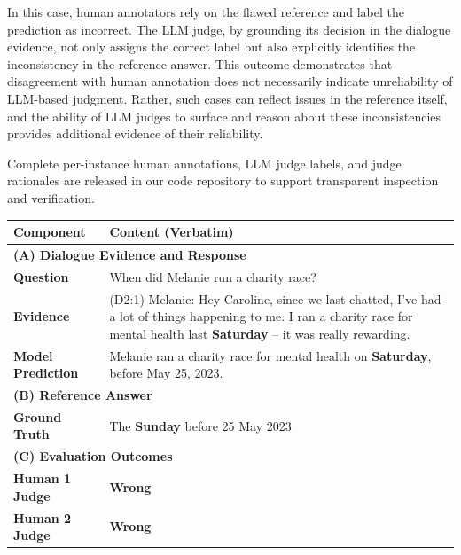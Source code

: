 \documentclass[11pt]{article}
\begin{document}
In this case, human annotators rely on the flawed reference and label the
prediction as incorrect.
The LLM judge, by grounding its decision in the dialogue evidence, not
only assigns the correct label but also explicitly identifies the
inconsistency in the reference answer.
This outcome demonstrates that disagreement with human annotation does
not necessarily indicate unreliability of LLM-based judgment.
Rather, such cases can reflect issues in the reference itself, and the
ability of LLM judges to surface and reason about these inconsistencies
provides additional evidence of their reliability.

Complete per-instance human annotations, LLM judge labels, and judge
rationales are released in our code repository to support transparent
inspection and verification.


\begin{table}[t]
\centering
\small
\setlength{\tabcolsep}{6pt}
\renewcommand{\arraystretch}{1.05}
\begin{tabular}{p{} p{}}
\toprule
\textbf{Component} & \textbf{Content (Verbatim)} \\
\midrule

\multicolumn{2}{l}{\textbf{(A) Dialogue Evidence and Response}} \\

\textbf{Question} &
When did Melanie run a charity race? \\

\textbf{Evidence} &
(D2:1) Melanie: Hey Caroline, since we last chatted, I've had a lot of
things happening to me. I ran a charity race for mental health last
\textbf{Saturday} – it was really rewarding. \\

\textbf{Model Prediction} &
Melanie ran a charity race for mental health on \textbf{Saturday}, before May 25,
2023. \\

\midrule
\multicolumn{2}{l}{\textbf{(B) Reference Answer}} \\

\textbf{Ground Truth} &
The \textbf{Sunday} before 25 May 2023 \\

\midrule
\multicolumn{2}{l}{\textbf{(C) Evaluation Outcomes}} \\

\textbf{Human 1 Judge} &
\textbf{Wrong} \\

\textbf{Human 2 Judge} &
\textbf{Wrong} \\


\end{tabular}
\end{table}
\end{document}

